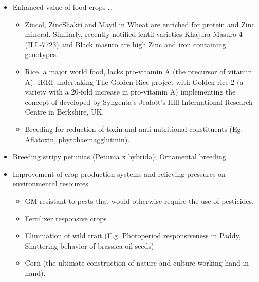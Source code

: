 \documentclass[11pt,ignorenonframetext,aspectratio=169]{beamer}
\providecommand{\tightlist}{%
  \setlength{\itemsep}{0pt}\setlength{\parskip}{0pt}}
\begin{document}
\begin{frame}{}
\protect\hypertarget{section-21}{}
\begin{itemize}
\tightlist
\item
  Enhanced value of food crops \ldots{}

  \begin{itemize}
  \tightlist
  \item
    Zincol, ZincShakti and Mayil in Wheat are enriched for protein and
    Zinc mineral. Similarly, recently notified lentil varieties Khajura
    Masuro-4 (ILL-7723) and Black masuro are high Zinc and iron
    containing genotypes.
  \item
    Rice, a major world food, lacks pro-vitamin A (the precursor of
    vitamin A). IRRI undertaking The Golden Rice project with Golden
    rice 2 (a variety with a 20-fold increase in pro-vitamin A)
    implementing the concept of developed by Syngenta's Jealott's Hill
    International Research Centre in Berkshire, UK.
  \item
    Breeding for reduction of toxin and anti-nutritional constituents
    (Eg. Aflatoxin,
    \href{https://en.wikipedia.org/wiki/Phytohaemagglutinin}{phytohaemagglutinin}).
  \end{itemize}
\end{itemize}
\end{frame}

\begin{frame}{}
\protect\hypertarget{section-22}{}
\begin{itemize}
\tightlist
\item
  Breeding stripy petunias (Petunia x hybrida); Ornamental breeding
\item
  Improvement of crop production systems and relieving pressures on
  environmental resources

  \begin{itemize}
  \tightlist
  \item
    GM resistant to pests that would otherwise require the use of
    pesticides.
  \item
    Fertilizer responsive crops
  \item
    Elimination of wild trait (E.g. Photoperiod responsiveness in Paddy,
    Shattering behavior of brassica oil seeds)
  \item
    Corn (the ultimate construction of nature and culture working hand
    in hand).
  \end{itemize}
\end{itemize}
\end{frame}
\end{document}
